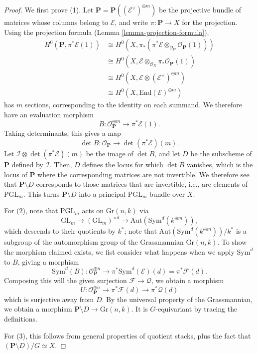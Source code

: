 \begin{proof}
We first prove (1).
Let $\mathbf{P} = \mathbf{P}( (\mathcal{E}^\vee)^{\oplus m})$ be the projective
bundle of matrices whose columns belong to $\mathcal{E}$, and write $\pi :
\mathbf{P} \to X$ for the projection.
Using the projection formula (Lemma \ref{lemma-projection-formula}),
\begin{align*}
H^0(\mathbf{P}, \pi^*\mathcal{E}(1))
& \cong H^0(X, \pi_*(\pi^*\mathcal{E} \otimes_{\mathcal{O}_{\mathbf{P}}}
\mathcal{O}_{\mathbf{P}}(1)))\\
& \cong H^0(X,\mathcal{E} \otimes_{\mathcal{O}_X}
\pi_*\mathcal{O}_{\mathbf{P}}(1))\\
& \cong H^0(X,\mathcal{E} \otimes (\mathcal{E}^\vee)^{\oplus m})\\
& \cong H^0(X,\mathrm{End}(\mathcal{E})^{\oplus m})
\end{align*}
has $m$ sections, corresponding to the identity on each summand.
We therefore have an evaluation morphism
$$
B : \mathcal{O}_{\mathbf{P}}^{\oplus m} \longrightarrow \pi^*\mathcal{E}(1).
$$
Taking determinants, this gives a map
$$
\det B : \mathcal{O}_{\mathbf{P}} \longrightarrow \det(\pi^*\mathcal{E}) (m).
$$
Let $\mathcal{I} \otimes \det(\pi^*\mathcal{E}) (m)$ be the image of $\det B$,
and let $D$ be the subscheme of $\mathbf{P}$ defined by $\mathcal{I}$.
Then, $D$ defines the locus for which $\det B$ vanishes, which is the locus of
$\mathbf{P}$ where the corresponding matrices are not invertible. We therefore
see that $\mathbf{P} \setminus D$ corresponds to those matrices that are
invertible, i.e., are elements of $\mathrm{PGL}_m$. This turns $\mathbf{P}
\setminus D$ into a principal $\mathrm{PGL}_m$-bundle over $X$.

For (2), note that $\mathrm{PGL}_m$ acts on $\mathrm{Gr}(n,k)$ via
$$
\mathrm{GL}_m \longrightarrow (\mathrm{GL}_m)^{\times d} \longrightarrow
\mathrm{Aut}(\mathrm{Sym}^d (k^{\oplus m})),
$$
which descends to their quotients by $k^*$; note that
$\mathrm{Aut}(\mathrm{Sym}^d (k^{\oplus m}))/k^*$ is a subgroup of the
automorphism group of the Grassmannian $\mathrm{Gr}(n,k)$.
To show the morphism claimed exists, we fist consider what happens when we
apply $\mathrm{Sym}^d$ to $B$, giving a morphism
$$
  \mathrm{Sym}^d(B) : \mathcal{O}_{\mathbf{P}}^{\oplus n} \to
    \pi^*\mathrm{Sym}^d(\mathcal{E})(d) = \pi^*\mathcal{F}(d).
$$
Composing this will the given surjection $\mathcal{F} \to \mathcal{Q}$, we
obtain a morphism
$$
  U : \mathcal{O}_{\mathbf{P}}^{\oplus n} \to
        \pi^*\mathcal{F}(d) \to
        \pi^*\mathcal{Q}(d)
$$
which is surjective away from $D$.
By the universal property of the Grassmannian, we obtain a morphism
$\mathbf{P} \setminus D \to \mathrm{Gr}(n,k)$. It is $G$-equivariant by tracing
the definitions.

For (3), this follows from general properties of quotient stacks, plus the fact
that $(\mathbf{P} \setminus D)/G \simeq X$.
\end{proof}

